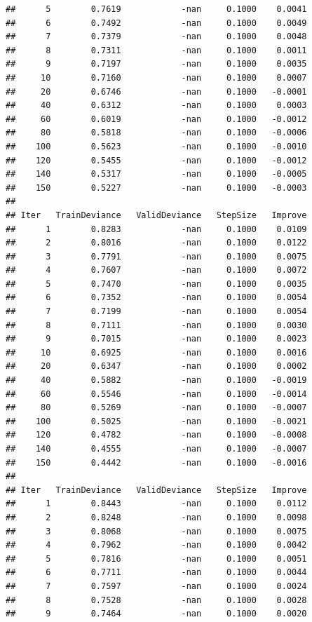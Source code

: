 \documentclass[]{book}
\begin{document}
\begin{verbatim}
##      5        0.7619            -nan     0.1000    0.0041
##      6        0.7492            -nan     0.1000    0.0049
##      7        0.7379            -nan     0.1000    0.0048
##      8        0.7311            -nan     0.1000    0.0011
##      9        0.7197            -nan     0.1000    0.0035
##     10        0.7160            -nan     0.1000    0.0007
##     20        0.6746            -nan     0.1000   -0.0001
##     40        0.6312            -nan     0.1000    0.0003
##     60        0.6019            -nan     0.1000   -0.0012
##     80        0.5818            -nan     0.1000   -0.0006
##    100        0.5623            -nan     0.1000   -0.0010
##    120        0.5455            -nan     0.1000   -0.0012
##    140        0.5317            -nan     0.1000   -0.0005
##    150        0.5227            -nan     0.1000   -0.0003
## 
## Iter   TrainDeviance   ValidDeviance   StepSize   Improve
##      1        0.8283            -nan     0.1000    0.0109
##      2        0.8016            -nan     0.1000    0.0122
##      3        0.7791            -nan     0.1000    0.0075
##      4        0.7607            -nan     0.1000    0.0072
##      5        0.7470            -nan     0.1000    0.0035
##      6        0.7352            -nan     0.1000    0.0054
##      7        0.7199            -nan     0.1000    0.0054
##      8        0.7111            -nan     0.1000    0.0030
##      9        0.7015            -nan     0.1000    0.0023
##     10        0.6925            -nan     0.1000    0.0016
##     20        0.6347            -nan     0.1000    0.0002
##     40        0.5882            -nan     0.1000   -0.0019
##     60        0.5546            -nan     0.1000   -0.0014
##     80        0.5269            -nan     0.1000   -0.0007
##    100        0.5025            -nan     0.1000   -0.0021
##    120        0.4782            -nan     0.1000   -0.0008
##    140        0.4555            -nan     0.1000   -0.0007
##    150        0.4442            -nan     0.1000   -0.0016
## 
## Iter   TrainDeviance   ValidDeviance   StepSize   Improve
##      1        0.8443            -nan     0.1000    0.0112
##      2        0.8248            -nan     0.1000    0.0098
##      3        0.8068            -nan     0.1000    0.0075
##      4        0.7962            -nan     0.1000    0.0042
##      5        0.7816            -nan     0.1000    0.0051
##      6        0.7711            -nan     0.1000    0.0044
##      7        0.7597            -nan     0.1000    0.0024
##      8        0.7528            -nan     0.1000    0.0028
##      9        0.7464            -nan     0.1000    0.0020

\end{verbatim}
\end{document}

